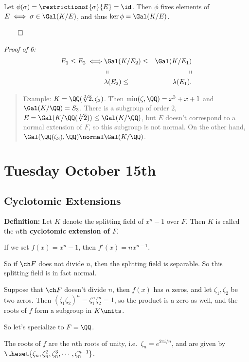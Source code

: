 Let \(\phi(\sigma) = \restrictionof{\sigma}{E} = \id\). Then \(\phi\)
fixes elements of \(E \iff \sigma \in \Gal(K/E)\), and thus
\(\ker \phi = \Gal(K/E)\).

\(\qed\)

\emph{Proof of 6:} \begin{align*}
E_1 \leq E_2 \iff &\Gal(K/E_2) \leq &\Gal(K/E_1) \\
& \shortparallel &\shortparallel \\
&\lambda(E_2) \leq &\lambda(E_1)
.\end{align*}

\begin{quote}
Example: \(K = \QQ(\sqrt[3] 2, \zeta_3)\). Then
\(\min(\zeta, \QQ) = x^2 + x + 1\) and \(\Gal(K/\QQ) = S_3\). There is a
subgroup of order 2, \(E = \Gal(K/\QQ(\sqrt[3] 2)) \leq \Gal(K/\QQ)\),
but \(E\) doesn't correspond to a normal extension of \(F\), so this
subgroup is not normal. On the other hand,
\(\Gal(\QQ(\zeta_3), \QQ) \normal \Gal(K/ \QQ)\).
\end{quote}

\hypertarget{tuesday-october-15th}{%
\section{Tuesday October 15th}\label{tuesday-october-15th}}

\hypertarget{cyclotomic-extensions}{%
\subsection{Cyclotomic Extensions}\label{cyclotomic-extensions}}

\textbf{Definition:} Let \(K\) denote the splitting field of \(x^n-1\)
over \(F\). Then \(K\) is called the \textbf{\(n\)th cyclotomic
extension of \(F\)}.

If we set \(f(x) = x^n-1\), then \(f'(x) = nx^{n-1}\).

So if \(\ch F\) does not divide \(n\), then the splitting field is
separable. So this splitting field is in fact normal.

Suppose that \(\ch F\) doesn't divide \(n\), then \(f(x)\) has \(n\)
zeros, and let \(\zeta_1, \zeta_2\) be two zeros. Then
\((\zeta_1 \zeta_2)^n = \zeta_1^n \zeta_2^n = 1\), so the product is a
zero as well, and the roots of \(f\) form a subgroup in \(K\units\).

So let's specialize to \(F = \QQ\).

The roots of \(f\) are the \(n\)th roots of unity,
i.e.~\(\zeta_n = e^{2\pi i / n}\), and are given by
\(\theset{\zeta_n, \zeta_n^2, \zeta_n^3, \cdots, \zeta_n^{n-1}}\).

